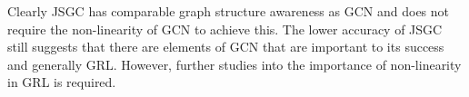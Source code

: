 Clearly JSGC has comparable graph structure awareness as GCN and does not require the non-linearity of GCN to achieve this.
The lower accuracy of JSGC still suggests that there are elements of GCN that are important to its success and generally GRL.
However, further studies into the importance of non-linearity in GRL is required.
